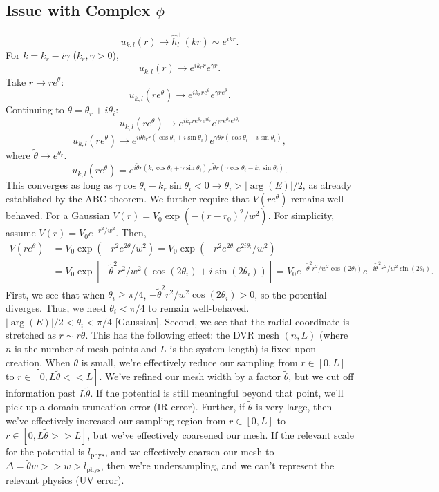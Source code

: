 \documentclass[12pt]{article}
\begin{document}
	\subsection*{Issue with Complex $\phi$}
	$$
		u_{k, l}(r) \rightarrow \hat{h}^+_l(kr)\sim e^{ikr}.
	$$
	For $k = k_r - i\gamma$ ($k_r, \gamma>0$),
	$$
		u_{k, l}(r) \rightarrow e^{ik_rr}e^{\gamma r}.
	$$
	Take $r\rightarrow re^{\theta}$:
	$$
		u_{k, l}(re^{\theta}) \rightarrow e^{ik_rre^\theta}e^{\gamma re^\theta}.
	$$
	Continuing to $\theta=\theta_r + i\theta_i$:
	$$
		u_{k, l}(re^{\theta}) \rightarrow e^{ik_r r e^{\theta_r}e^{i\theta_i}}e^{\gamma r e^{\theta_r}e^{i\theta_i}}
	$$
	$$
		u_{k, l}(re^\theta) \rightarrow e^{i\tilde{\theta}k_rr(\cos\theta_i+i\sin\theta_i)}e^{\gamma\tilde{\theta}r(\cos\theta_i+i\sin\theta_i)},
	$$
	where $\tilde{\theta} \rightarrow e^{\theta_r}$. 
	$$
		u_{k, l}(re^{\theta}) = e^{i\tilde{\theta}r(k_r\cos\theta_i+\gamma\sin\theta_i)}e^{\tilde{\theta}r(\gamma\cos\theta_i-k_r\sin\theta_i)}.
	$$
	This converges as long as $\gamma\cos\theta_i - k_r\sin\theta_i < 0\rightarrow \theta_i > |\arg(E)|/2$, as already established by the ABC theorem. We further require that $V(re^{\theta})$ remains well behaved. For a Gaussian $V(r) = V_0 \exp(-(r-r_0)^2/w^2)$. For simplicity, assume $V(r) = V_0 e^{-r^2/w^2}$. Then,
	\begin{align*}
		V(re^\theta) &= V_0 \exp (-r^2e^{2\theta}/w^2) = V_0\exp(-r^2e^{2\theta_r}e^{2i\theta_i}/w^2)\\
		&=V_0\exp[-\tilde{\theta}^2r^2/w^2(\cos(2\theta_i)+i\sin(2\theta_i))] =V_0e^{-\tilde{\theta}^2r^2/w^2\cos(2\theta_i)}e^{-i\tilde{\theta}^2r^2/w^2\sin(2\theta_i)}.
	\end{align*}
	First, we see that when $\theta_i\ge \pi/4$, $-\tilde{\theta}^2r^2/w^2\cos(2\theta_i)>0$, so the potential diverges. Thus, we need $\theta_i < \pi/4$ to remain well-behaved. $|\arg(E)|/2< \theta_i< \pi/4$ [Gaussian]. Second, we see that the radial coordinate is stretched as $r\sim r\tilde{\theta}$. This has the following effect: the DVR mesh $(n, L)$ (where $n$ is the number of mesh points and $L$ is the system length) is fixed upon creation. When $\tilde{\theta}$ is small, we're effectively reduce our sampling from $r\in [0, L]$ to $r\in [0, L\tilde{\theta}<<L]$. We've refined our mesh width by a factor $\tilde{\theta}$, but we cut off information past $L\tilde{\theta}$. If the potential is still meaningful beyond that point, we'll pick up a domain truncation error (IR error). Further, if $\tilde{\theta}$ is very large, then we've effectively increased our sampling region from $r\in [0, L]$ to $r\in [0, L\tilde{\theta}>>L]$, but we've effectively coarsened our mesh. If the relevant scale for the potential is $l_\text{phys}$, and we effectively coarsen our mesh to $\Delta = \tilde{\theta}w>>w > l_\text{phys}$, then we're undersampling, and we can't represent the relevant physics (UV error).
	
\end{document}
